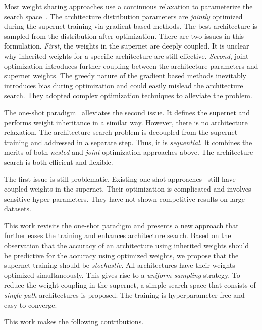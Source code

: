 Most weight sharing approaches use a continuous relaxation to parameterize the search space~\cite{wu2018fbnet,cai2018proxylessnas,liu2018darts,xie2018snas,zhang2018you}. The architecture distribution parameters are \emph{jointly} optimized during the supernet training via gradient based methods. The best architecture is sampled from the distribution after optimization. There are two issues in this formulation. \emph{First}, the weights in the supernet are deeply coupled. It is unclear why inherited weights for a specific architecture are still effective. \emph{Second}, joint optimization introduces further coupling between the architecture parameters and supernet weights. The greedy nature of the gradient based methods inevitably introduces bias during optimization and could easily mislead the architecture search. They adopted complex optimization techniques to alleviate the problem.

The one-shot paradigm~\cite{brock2017smash,bender2018understanding} alleviates the second issue. It defines the supernet and performs weight inheritance in a similar way. However, there is no architecture  relaxation. The architecture search problem is decoupled from the supernet training and addressed in a separate step. Thus, it is \emph{sequential}. It combines the merits of both \emph{nested} and \emph{joint} optimization approaches above. The architecture search is both efficient and flexible.

The first issue is still problematic. Existing one-shot approaches~\cite{brock2017smash,bender2018understanding} still have coupled weights in the supernet. Their optimization is complicated and involves sensitive hyper parameters. They have not shown competitive results on large datasets.

This work revisits the one-shot paradigm and presents a new approach that further eases the training and enhances architecture search. Based on the observation that the accuracy of an architecture using inherited weights should be predictive for the accuracy using optimized weights, we propose that the supernet training should be \emph{stochastic}. All architectures have their weights optimized simultaneously. This gives rise to a \emph{uniform sampling} strategy. To reduce the weight coupling in the supernet, a simple search space that consists of \emph{single path} architectures is proposed. The training is hyperparameter-free and easy to converge.

This work makes the following contributions.

